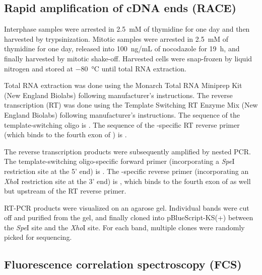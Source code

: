 \subsection{Rapid amplification of cDNA ends (RACE)}
Interphase samples were arrested in \SI{2.5}{mM} of thymidine for one day and then harvested by trypsinization. Mitotic samples were arrested in \SI{2.5}{mM} of thymidine for one day, released into \SI{100}{ng/mL} of nocodazole for \SI{19}{h}, and finally harvested by mitotic shake-off. Harvested cells were snap-frozen by liquid nitrogen and stored at \SI{-80}{\celsius} until total RNA extraction.

Total RNA extraction was done using the Monarch Total RNA Miniprep Kit (New England Biolabs) following manufacturer’s instructions. The reverse transcription (RT) was done using the Template Switching RT Enzyme Mix (New England Biolabs) following manufacturer’s instructions. The sequence of the template-switching oligo is . The sequence of the -specific RT reverse primer (which binds to the fourth exon of ) is .

The reverse transcription products were subsequently amplified by nested PCR. The template-switching oligo-specific forward primer (incorporating a \textit{Spe}I restriction site at the 5' end) is . The -specific reverse primer (incorporating an \textit{Xho}I restriction site at the 3' end) is , which binds to the fourth exon of  as well but upstream of the RT reverse primer.

RT-PCR products were visualized on an agarose gel. Individual bands were cut off and purified from the gel, and finally cloned into pBlueScript-KS(+) between the \textit{Spe}I site and the \textit{Xho}I site. For each band, multiple clones were randomly picked for sequencing.

\subsection{Fluorescence correlation spectroscopy (FCS)}
\label{FCSMethods}

